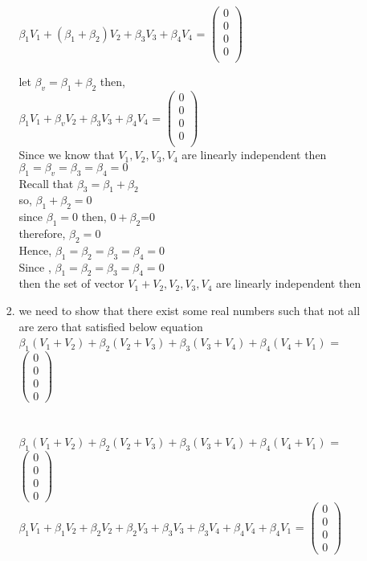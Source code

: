 \documentclass[45pt]{article}
\begin{document}
\begin{enumerate}
\begin{enumerate}
\begin{enumerate}
$\beta_1 V_1+ (\beta_1 +\beta_2) V_2+\beta_3 V_3+ \beta_4 V_4$ =
$\begin{pmatrix}
0\\0\\0\\0\\
\end{pmatrix}$

let $\beta_v=\beta_1+\beta_2$ then,\\

$\beta_1 V_1+ \beta_v  V_2+\beta_3 V_3+ \beta_4 V_4$ =
$\begin{pmatrix}
0\\0\\0\\0\\
\end{pmatrix}$\\
Since we know that $V_1,V_2,V_3,V_4$ are linearly independent then \\ $\beta_1=\beta_v=\beta_3=\beta_4=0$\\
Recall that $\beta_3=\beta_1+\beta_2$\\
so, $\beta_1+\beta_2=0$\\ 
since $\beta_1=0$ then, $0+\beta_2$=0\\  
therefore, $\beta_2=0$\\
Hence, $\beta_1=\beta_2=\beta_3=\beta_4=0$\\ 
Since , $\beta_1=\beta_2=\beta_3=\beta_4=0$\\ 
then the set of vector  {$V_1+V_2,V_2,V_3,V_4$} are linearly independent then \\

\item we need to show that there exist some real numbers such that not all are zero that satisfied below equation\\
$\beta_1 (V_1+V_2)+\beta_2 (V_2+V_3)+\beta_3 (V_3+V_4)+ \beta_4 (V_4+V_1)$ =
$\begin{pmatrix}
0\\0\\0\\0
\end{pmatrix}
$ \\\\

\\
$\beta_1 (V_1+V_2)+\beta_2 (V_2+V_3)+\beta_3 (V_3+V_4)+ \beta_4 (V_4+V_1)$ =
$\begin{pmatrix}
0\\0\\0\\0
\end{pmatrix}$\\
$\beta_1 V_1+\beta_1 V_2+\beta_2 V_2+ \beta_2 V_3+\beta_3 V_3+\beta_3 V_4+ \beta_4 V_4+ \beta_4 V_1$ =
$\begin{pmatrix}
0\\0\\0\\0
\end{pmatrix}$\\


\end{enumerate}
\end{enumerate}
\end{enumerate}
\end{document}
